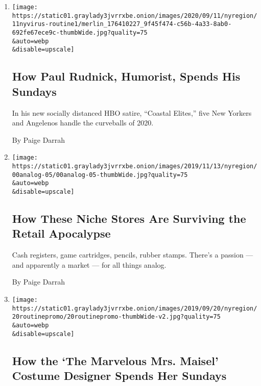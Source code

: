 \begin{enumerate}
\def\labelenumi{\arabic{enumi}.}
\item
  \href{/2020/09/11/nyregion/coronavirus-paul-rudnick-coastal-elites.html}{}

  \texttt{[image: https://static01.graylady3jvrrxbe.onion/images/2020/09/11/nyregion/11nyvirus-routine1/merlin\_176410227\_9f45f474-c56b-4a33-8ab0-692fe67ece9c-thumbWide.jpg?quality=75\\\&auto=webp\\\&disable=upscale]}

  \hypertarget{how-paul-rudnick-humorist-spends-his-sundays}{%
  \subsection{How Paul Rudnick, Humorist, Spends His
  Sundays}\label{how-paul-rudnick-humorist-spends-his-sundays}}

  In his new socially distanced HBO satire, ``Coastal Elites,'' five New
  Yorkers and Angelenos handle the curveballs of 2020.

  By Paige Darrah
\item
  \href{/2019/11/15/nyregion/analog-era-shops-nyc.html}{}

  \texttt{[image: https://static01.graylady3jvrrxbe.onion/images/2019/11/13/nyregion/00analog-05/00analog-05-thumbWide.jpg?quality=75\\\&auto=webp\\\&disable=upscale]}

  \hypertarget{how-these-niche-stores-are-surviving-the-retail-apocalypse}{%
  \subsection{How These Niche Stores Are Surviving the Retail
  Apocalypse}\label{how-these-niche-stores-are-surviving-the-retail-apocalypse}}

  Cash registers, game cartridges, pencils, rubber stamps. There's a
  passion --- and apparently a market --- for all things analog.

  By Paige Darrah
\item
  \href{/2019/09/20/nyregion/marvelous-mrs-maisel-costume-designer.html}{}

  \texttt{[image: https://static01.graylady3jvrrxbe.onion/images/2019/09/20/nyregion/20routinepromo/20routinepromo-thumbWide-v2.jpg?quality=75\\\&auto=webp\\\&disable=upscale]}

  \hypertarget{how-the-the-marvelous-mrs-maisel-costume-designer-spends-her-sundays}{%
  \subsection{How the `The Marvelous Mrs. Maisel' Costume Designer
  Spends Her
  Sundays}\label{how-the-the-marvelous-mrs-maisel-costume-designer-spends-her-sundays}}


\end{enumerate}
